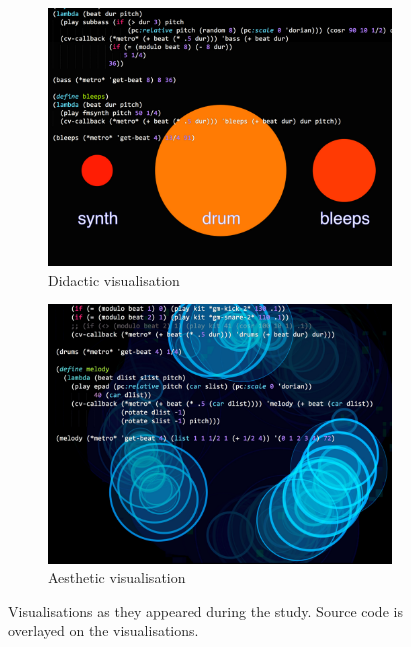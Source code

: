\begin{figure}
\centering
\begin{subfigure}{.5\textwidth}
  \centering
  \includegraphics[width=.95\linewidth]{../study-2/results/visualisations/didactic-vis-overlay}
  \caption{Didactic visualisation}
  \label{fig:didactic-overlay}
\end{subfigure}%
\begin{subfigure}{.5\textwidth}
  \centering
  \includegraphics[width=.95\linewidth]{../study-2/results/visualisations/aesthetic-vis-overlay}
  \caption{Aesthetic visualisation}
  \label{fig:aesthetic-overlay}
\end{subfigure}

\caption[Visualisations with source code overlay]{Visualisations as they appeared during the study. Source code is overlayed on the visualisations.}
\label{fig:visualisation-overlay}
\end{figure}

